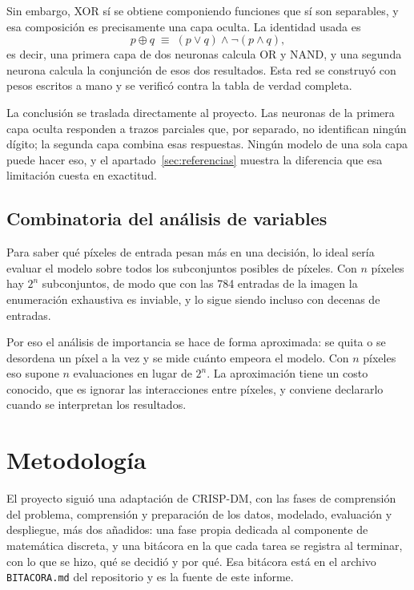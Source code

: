 \documentclass[12pt,letterpaper]{article}
\begin{document}
Sin embargo, XOR sí se obtiene componiendo funciones que sí son separables, y esa
composición es precisamente una capa oculta. La identidad usada es
\[
  p \oplus q \;\equiv\; (p \vee q) \wedge \neg(p \wedge q),
\]
es decir, una primera capa de dos neuronas calcula OR y NAND, y una segunda
neurona calcula la conjunción de esos dos resultados. Esta red se construyó con
pesos escritos a mano y se verificó contra la tabla de verdad completa.

La conclusión se traslada directamente al proyecto. Las neuronas de la primera capa
oculta responden a trazos parciales que, por separado, no identifican ningún
dígito; la segunda capa combina esas respuestas. Ningún modelo de una sola capa
puede hacer eso, y el apartado~\ref{sec:referencias} muestra la diferencia que esa
limitación cuesta en exactitud.

\subsection{Combinatoria del análisis de variables}
\label{sec:combinatoria}

Para saber qué píxeles de entrada pesan más en una decisión, lo ideal sería evaluar
el modelo sobre todos los subconjuntos posibles de píxeles. Con $n$ píxeles hay
$2^{n}$ subconjuntos, de modo que con las 784 entradas de la imagen la enumeración
exhaustiva es inviable, y lo sigue siendo incluso con decenas de entradas.

Por eso el análisis de importancia se hace de forma aproximada: se quita o se
desordena un píxel a la vez y se mide cuánto empeora el modelo. Con $n$ píxeles eso
supone $n$ evaluaciones en lugar de $2^{n}$. La aproximación tiene un costo
conocido, que es ignorar las interacciones entre píxeles, y conviene declararlo
cuando se interpretan los resultados.

\section{Metodología}

El proyecto siguió una adaptación de CRISP-DM, con las fases de comprensión del
problema, comprensión y preparación de los datos, modelado, evaluación y
despliegue, más dos añadidos: una fase propia dedicada al componente de matemática
discreta, y una bitácora en la que cada tarea se registra al terminar, con lo que
se hizo, qué se decidió y por qué. Esa bitácora está en el archivo
\texttt{BITACORA.md} del repositorio y es la fuente de este informe.
\end{document}
